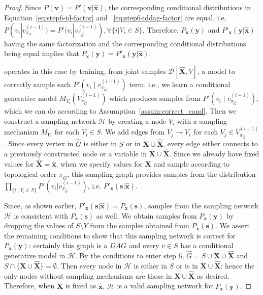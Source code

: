 \documentclass{article}
\newcommand{\h}{\mathcal{H}}
\newcommand{\x}{\mathbf{x}}
\newcommand{\y}{\mathbf{y}}
\newcommand{\X}{\mathbf{X}}
\newcommand{\Xp}{{\hat{\mathbf{X}}}}
\newcommand{\xp}{{\hat{\mathbf{x}}}}
\newcommand{\Gp}{{\hat{{G}}}}
\newcommand{\vb}{\mathbf{v}}
\newcommand{\mbf}{\mathbf}
\newcommand{\data}{\mathcal{D}}
\newcommand{\idgen}{\text{ID-GEN}\xspace}
\theoremstyle{plain}
\theoremstyle{definition}
\theoremstyle{remark}
\begin{document}
\begin{proof}
		Since $P(\vb) = P'(\vb|\xp)$,
		the corresponding conditional distributions in Equation~\ref{eq:step6-id-factor} and ~\ref{eq:step6-iddag-factor} are equal, i.e,  $P(v_i | v_{\pi_{G}}^{(i-1)}) = P'(v_i| v_{\pi_{\Gp}}^{(i-1)}), \forall \{i|V_i\in S\}$. 
		Therefore, $P_{\x}(\y)$ and $P'_{\x}(\y|\xp)$ having the same factorization and the corresponding conditional distributions being equal implies that $P_{\x}(\y) = P'_{\x}(\y|\xp)$.
		
		
		\idgen operates in this case by training, from joint samples $\data[\Xp, V]$, a model to correctly sample each $P'(v_i \mid v_{\pi_{\Gp}}^{(i-1)})$ term, i.e., we learn a conditional generative model $M_{V_i}(V_{\pi_{\Gp}}^{(i-1)})$ which produces samples from $P'(v_i \mid v_{\pi_{\Gp}}^{(i-1)})$, which we can do according to Assumption~\ref{assum:correct_cond}. Then we construct a sampling network $\h$ by creating a node $V_i$ with a sampling mechanism $M_{V_i}$ for each $V_i \in S$. We add edges from $V_j\to V_i$ for each $V_j\in V_{\pi_{\Gp}}^{(i-1)}$. Since every vertex in $\Gp$ is either in $S$ or in $\X \cup \Xp$, every edge either connects to a previously constructed node or a variable in $\X \cup \Xp$. 
		Since we already have fixed values for $\Xp=\xp$, when we specify values for $\X$ and sample according to topological order $\pi_{\Gp}$, this sampling graph provides samples from the distribution $\prod_{\{i\mid V_i\in S\}}P'(v_i| v_{\pi_{\Gp}}^{(i-1)})$, i.e. $P'_{\x}(\mbf{s}|\xp)$. 
		
		Since, as shown earlier, $P'_{\x}(\mbf{s}|\xp) = P_{\x}(\mbf{s})$, samples from the sampling network $\h$ is consistent with $P_{\x}(\mbf{s})$ as well.   
		We obtain samples from $P_{\x}(\y)$ by dropping the values of $S\setminus Y$ from the samples obtained from $ P_{\x}(\mbf{s})$. 
		We assert the remaining conditions to show that this sampling network is correct for $P_{\x}(\y)$: certainly this graph is a $DAG$ and every $v\in S$ has a conditional generative model in $\h$. By the conditions to enter step 6, 
		$\Gp=S\cup \X \cup \Xp$ and $S\cap \{\X \cup \Xp \}=\emptyset$. Then every node in $\h$ is either in $S$ or is in $\X \cup \Xp$: hence the only nodes without sampling mechanisms are those in $\X \cup \Xp$ as desired.
		Therefore, when $\Xp$ is fixed as $\xp$, $\h$ is a valid sampling network for $P_{\x}(\y).$
	\end{proof}
\end{document}
